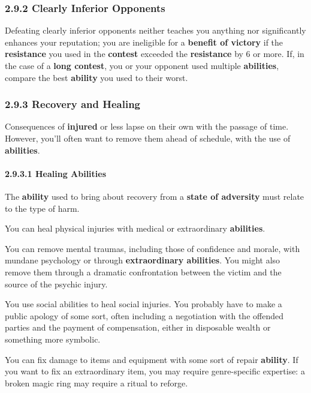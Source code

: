 \documentclass[
]{article}
\begin{document}
\hypertarget{clearly-inferior-opponents}{%
\subsubsection{2.9.2 Clearly Inferior
Opponents}\label{clearly-inferior-opponents}}

Defeating clearly inferior opponents neither teaches you anything nor
significantly enhances your reputation; you are ineligible for a
\textbf{benefit of victory} if the \textbf{resistance} you used in the
\textbf{contest} exceeded the \textbf{resistance} by 6 or more. If, in
the case of a \textbf{long contest}, you or your opponent used multiple
\textbf{abilities}, compare the best \textbf{ability} you used to their
worst.

\hypertarget{recovery-and-healing}{%
\subsubsection{2.9.3 Recovery and Healing}\label{recovery-and-healing}}

Consequences of \textbf{injured} or less lapse on their own with the
passage of time. However, you'll often want to remove them ahead of
schedule, with the use of \textbf{abilities}.

\hypertarget{healing-abilities}{%
\paragraph{2.9.3.1 Healing Abilities}\label{healing-abilities}}

The \textbf{ability} used to bring about recovery from a \textbf{state
of adversity} must relate to the type of harm.

You can heal physical injuries with medical or extraordinary
\textbf{abilities}.

You can remove mental traumas, including those of confidence and morale,
with mundane psychology or through \textbf{extraordinary abilities}. You
might also remove them through a dramatic confrontation between the
victim and the source of the psychic injury.

You use social abilities to heal social injuries. You probably have to
make a public apology of some sort, often including a negotiation with
the offended parties and the payment of compensation, either in
disposable wealth or something more symbolic.

You can fix damage to items and equipment with some sort of repair
\textbf{ability}. If you want to fix an extraordinary item, you may
require genre-specific expertise: a broken magic ring may require a
ritual to reforge.
\end{document}
